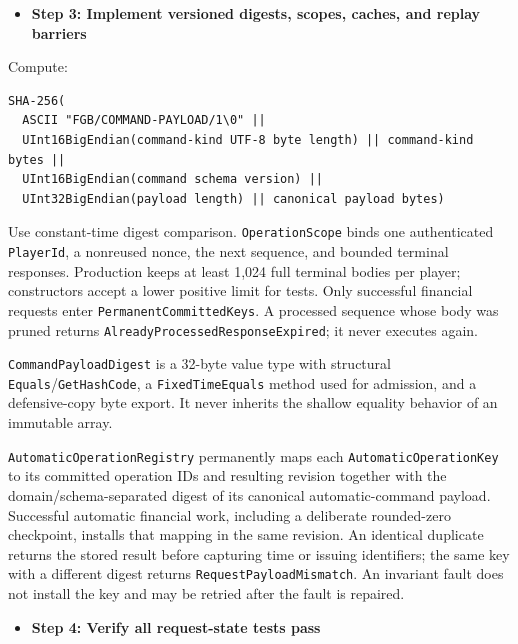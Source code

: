\documentclass[
  10pt,
  letterpaper,
]{article}
\newcommand{\passthrough}[1]{#1}
\providecommand{\tightlist}{%
  \setlength{\itemsep}{0pt}\setlength{\parskip}{0pt}}
\begin{document}
\begin{itemize}
\tightlist
\item[$\square$]
  \textbf{Step 3: Implement versioned digests, scopes, caches, and
  replay barriers}
\end{itemize}

Compute:

\begin{lstlisting}
SHA-256(
  ASCII "FGB/COMMAND-PAYLOAD/1\0" ||
  UInt16BigEndian(command-kind UTF-8 byte length) || command-kind bytes ||
  UInt16BigEndian(command schema version) ||
  UInt32BigEndian(payload length) || canonical payload bytes)
\end{lstlisting}

Use constant-time digest comparison.
\passthrough{\lstinline!OperationScope!} binds one authenticated
\passthrough{\lstinline!PlayerId!}, a nonreused nonce, the next
sequence, and bounded terminal responses. Production keeps at least
1,024 full terminal bodies per player; constructors accept a lower
positive limit for tests. Only successful financial requests enter
\passthrough{\lstinline!PermanentCommittedKeys!}. A processed sequence
whose body was pruned returns \texttt{AlreadyProcessedResponseExpired};
it never executes again.

\passthrough{\lstinline!CommandPayloadDigest!} is a 32-byte value type
with structural
\passthrough{\lstinline!Equals!}/\passthrough{\lstinline!GetHashCode!},
a \passthrough{\lstinline!FixedTimeEquals!} method used for admission,
and a defensive-copy byte export. It never inherits the shallow equality
behavior of an immutable array.

\texttt{AutomaticOperationRegistry} permanently maps each
\passthrough{\lstinline!AutomaticOperationKey!} to its committed
operation IDs and resulting revision together with the
domain/schema-separated digest of its canonical automatic-command
payload. Successful automatic financial work, including a deliberate
rounded-zero checkpoint, installs that mapping in the same revision. An
identical duplicate returns the stored result before capturing time or
issuing identifiers; the same key with a different digest returns
\passthrough{\lstinline!RequestPayloadMismatch!}. An invariant fault
does not install the key and may be retried after the fault is repaired.

\begin{itemize}
\tightlist
\item[$\square$]
  \textbf{Step 4: Verify all request-state tests pass}
\end{itemize}
\end{document}

